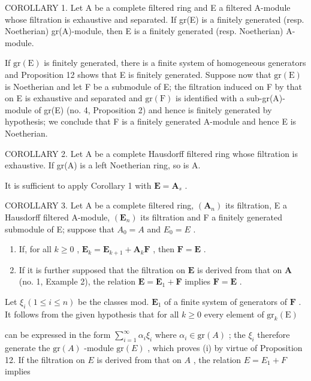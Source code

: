 COROLLARY 1. Let A be a complete filtered ring and E a filtered A-module whose filtration is exhaustive and separated. If gr(E) is a finitely generated (resp. Noetherian) gr(A)-module, then E is a finitely generated (resp. Noetherian) A-module.

If \(\mathrm{gr}(\mathrm{E})\) is finitely generated, there is a finite system of homogeneous generators and Proposition 12 shows that E is finitely generated. Suppose now that \(\mathrm{gr}(\mathrm{E})\) is Noetherian and let F be a submodule of E; the filtration induced on F by that on E is exhaustive and separated and \(\mathrm{gr}(\mathrm{F})\) is identified with a sub-gr(A)-module of gr(E) (no. 4, Proposition 2) and hence is finitely generated by hypothesis; we conclude that F is a finitely generated A-module and hence E is Noetherian.

COROLLARY 2. Let A be a complete Hausdorff filtered ring whose filtration is exhaustive. If gr(A) is a left Noetherian ring, so is A.

It is sufficient to apply Corollary 1 with \(\mathbf{E} = \mathbf{A}_s\) .

COROLLARY 3. Let A be a complete filtered ring, \((\mathbf{A}_{n})\) its filtration, E a Hausdorff filtered A-module, \((\mathbf{E}_{n})\) its filtration and F a finitely generated submodule of E; suppose that \(A_{0} = A\) and \(E_{0} = E\) .

\begin{enumerate}
\def\labelenumi{(\roman{enumi})}
\item
  If, for all \(k \geqslant 0\) , \(\mathbf{E}_k = \mathbf{E}_{k+1} + \mathbf{A}_k\mathbf{F}\) , then \(\mathbf{F} = \mathbf{E}\) .
\item
  If it is further supposed that the filtration on \(\mathbf{E}\) is derived from that on \(\mathbf{A}\) (no. 1, Example 2), the relation \(\mathbf{E} = \mathbf{E}_1 + \mathbf{F}\) implies \(\mathbf{F} = \mathbf{E}\) .
\end{enumerate}

Let \(\xi_{i}(1\leqslant i\leqslant n)\) be the classes mod. \(\mathbf{E}_1\) of a finite system of generators of \(\mathbf{F}\) . It follows from the given hypothesis that for all \(k\geqslant 0\) every element of \(\mathrm{gr}_k(\mathrm{E})\)

can be expressed in the form \(\sum_{i=1}^{\infty} \alpha_i \xi_i\) where \(\alpha_i \in \mathrm{gr}(A)\) ; the \(\xi_i\) therefore generate the \(\mathrm{gr}(A)\) -module \(\mathrm{gr}(E)\) , which proves (i) by virtue of Proposition 12. If the filtration on \(E\) is derived from that on \(A\) , the relation \(E = E_1 + F\) implies

